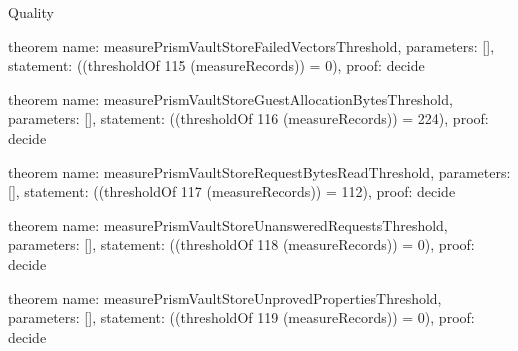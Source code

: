 \begin{lexlean}{Quality}
\begin{semanticmodule}
theorem{
  name: measurePrismVaultStoreFailedVectorsThreshold,
  parameters: [],
  statement: ((thresholdOf 115 (measureRecords)) = 0),
  proof: decide{}
}

theorem{
  name: measurePrismVaultStoreGuestAllocationBytesThreshold,
  parameters: [],
  statement: ((thresholdOf 116 (measureRecords)) = 224),
  proof: decide{}
}

theorem{
  name: measurePrismVaultStoreRequestBytesReadThreshold,
  parameters: [],
  statement: ((thresholdOf 117 (measureRecords)) = 112),
  proof: decide{}
}

theorem{
  name: measurePrismVaultStoreUnansweredRequestsThreshold,
  parameters: [],
  statement: ((thresholdOf 118 (measureRecords)) = 0),
  proof: decide{}
}

theorem{
  name: measurePrismVaultStoreUnprovedPropertiesThreshold,
  parameters: [],
  statement: ((thresholdOf 119 (measureRecords)) = 0),
  proof: decide{}
}
\end{semanticmodule}
\end{lexlean}
